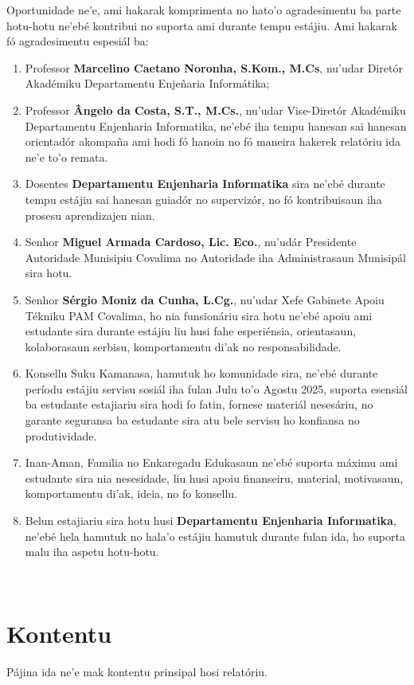 \documentclass[12pt,a4paper]{article}
\begin{document}
Oportunidade ne’e, ami hakarak komprimenta no hato’o agradesimentu ba parte hotu-hotu ne’ebé kontribui no suporta ami durante tempu estájiu. Ami hakarak fó agradesimentu espesiál ba:

\begin{enumerate}
    \item Professor \textbf{Marcelino Caetano Noronha, S.Kom., M.Cs}, nu’udar Diretór Akadémiku Departamentu Enjeñaria Informátika;
    \item Professor \textbf{Ângelo da Costa, S.T., M.Cs.}, nu’udar Vise-Diretór Akadémiku Departamentu Enjenharia Informatika, ne’ebé iha tempu hanesan sai hanesan orientadór akompaña ami hodi fó hanoin no fó maneira hakerek relatóriu ida ne’e to’o remata.
    \item Dosentes \textbf{Departamentu Enjenharia Informatika} sira ne’ebé durante tempu estájiu sai hanesan guiadór no supervizór, no fó kontribuisaun iha prosesu aprendizajen nian.
    \item Senhor \textbf{Miguel Armada Cardoso, Lic. Eco.}, nu’udár Presidente Autoridade Munisipiu Covalima no Autoridade iha Administrasaun Munisipál sira hotu.
    \item Senhor \textbf{Sérgio Moniz da Cunha, L.Cg.}, nu’udar Xefe Gabinete Apoiu Tékniku PAM Covalima, ho nia funsionáriu sira hotu ne’ebé apoiu ami estudante sira durante estájiu liu husi fahe esperiénsia, orientasaun, kolaborasaun serbisu, komportamentu di’ak no responsabilidade.
    \item Konsellu Suku Kamanasa, hamutuk ho komunidade sira, ne’ebé durante períodu estájiu servisu sosiál iha fulan Julu to’o Agostu 2025, suporta esensiál ba estudante estajiariu sira hodi fo fatin, fornese materiál nesesáriu, no garante seguransa ba estudante sira atu bele servisu ho konfiansa no produtividade.
    \item Inan-Aman, Familia no Enkaregadu Edukasaun ne’ebé suporta máximu ami estudante sira nia nesesidade, liu husi apoiu finanseiru, material, motivasaun, komportamentu di’ak, ideia, no fo konsellu.
    \item Belun estajiariu sira hotu husi \textbf{Departamentu Enjenharia Informatika}, ne’ebé hela hamutuk no hala’o estájiu hamutuk durante fulan ida, ho suporta malu iha aspetu hotu-hotu.
\end{enumerate}

\newpage
~

\newpage
\section{Kontentu}
Pájina ida ne'e mak kontentu prinsipal hosi relatóriu.
\end{document}
